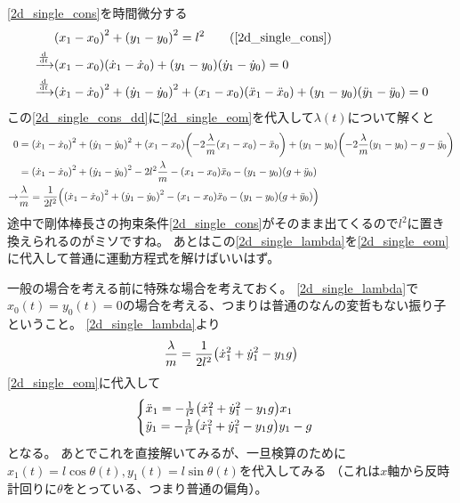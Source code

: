 \documentclass[uplatex]{jsarticle}
\begin{document}
\eqref{2d_single_cons}を時間微分する
\begin{align}
    &\qty(x_1 - x_0)^2 + \qty(y_1 - y_0)^2 = l^2 \tag{\ref{2d_single_cons}} \\
    \xrightarrow{\dv{}{t}}&
    \qty(x_1 - x_0) \qty(\dot{x}_1 - \dot{x}_0) + \qty(y_1 - y_0) \qty(\dot{y}_1 - \dot{y}_0) = 0 \\
    \xrightarrow{\dv{}{t}}&
    \qty(\dot{x}_1 - \dot{x}_0)^2 + \qty(\dot{y}_1 - \dot{y}_0)^2 
        + \qty(x_1 - x_0) \qty(\ddot{x}_1 - \ddot{x}_0) + \qty(y_1 - y_0) \qty(\ddot{y}_1 - \ddot{y}_0)= 0
        \label{2d_single_cons_dd}
\end{align}
この\eqref{2d_single_cons_dd}に\eqref{2d_single_eom}を代入して$\lambda(t)$について解くと
\begin{align}
    0 &= \qty(\dot{x}_1 - \dot{x}_0)^2 + \qty(\dot{y}_1 - \dot{y}_0)^2
        + \qty(x_1 - x_0)\qty(-2\frac{\lambda}{m}\qty(x_1 - x_0) - \ddot{x}_0)
        + \qty(y_1 - y_0)\qty(-2\frac{\lambda}{m}\qty(y_1 - y_0) - g - \ddot{y}_0) \nonumber \\
    &= \qty(\dot{x}_1 - \dot{x}_0)^2 + \qty(\dot{y}_1 - \dot{y}_0)^2
        -2 l^2 \frac{\lambda}{m}
        - \qty(x_1 - x_0) \ddot{x}_0
        - \qty(y_1 - y_0)\qty(g + \ddot{y}_0) \nonumber \\
    \rightarrow&
    \frac{\lambda}{m} = \frac{1}{2 l^2} \qty(
        \qty(\dot{x}_1 - \dot{x}_0)^2 + \qty(\dot{y}_1 - \dot{y}_0)^2
        - \qty(x_1 - x_0) \ddot{x}_0 - \qty(y_1 - y_0)\qty(g + \ddot{y}_0)
    ) \label{2d_single_lambda}
\end{align}
途中で剛体棒長さの拘束条件\eqref{2d_single_cons}がそのまま出てくるので$l^2$に置き換えられるのがミソですね。
あとはこの\eqref{2d_single_lambda}を\eqref{2d_single_eom}に代入して普通に運動方程式を解けばいいはず。

一般の場合を考える前に特殊な場合を考えておく。
\eqref{2d_single_lambda}で$x_0(t)=y_0(t)=0$の場合を考える、つまりは普通のなんの変哲もない振り子ということ。
\eqref{2d_single_lambda}より
\begin{align}
    \frac{\lambda}{m} = \frac{1}{2 l^2} \qty(\dot{x}_1^2 + \dot{y}_1^2 - y_1 g)
\end{align}
\eqref{2d_single_eom}に代入して
\begin{align}
\begin{cases}
    \ddot{x}_1 = -\frac{1}{l^2} \qty(\dot{x}_1^2 + \dot{y}_1^2 - y_1 g) x_1 \\
    \ddot{y}_1 = -\frac{1}{l^2} \qty(\dot{x}_1^2 + \dot{y}_1^2 - y_1 g) y_1 - g
\end{cases}
\end{align}
となる。
あとでこれを直接解いてみるが、一旦検算のために$x_1(t)=l\cos{\theta(t)}, y_1(t)=l\sin{\theta(t)}$を代入してみる
（これは$x$軸から反時計回りに$\theta$をとっている、つまり普通の偏角）。
\end{document}
